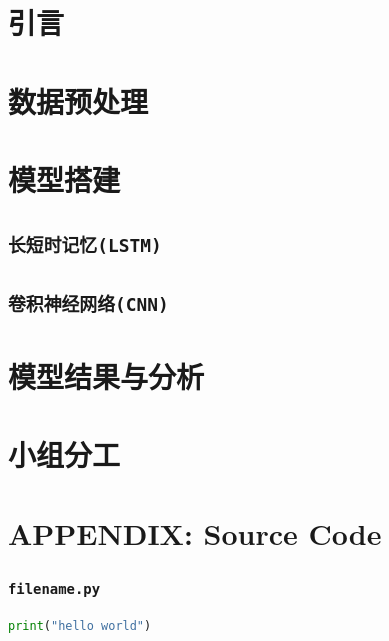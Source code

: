 \documentclass[11pt,a4paper]{elegantpaper}
\begin{document}
\begin{multicols}{2}
\section{引言}


\section{数据预处理}

\section{模型搭建}


\subsection{\lstinline{长短时记忆(LSTM)}}

\subsection{\lstinline{卷积神经网络(CNN)}}


\section{模型结果与分析}


\section{小组分工}

\section{APPENDIX: Source Code}

\subsubsection{\lstinline{filename.py}}

\begin{lstlisting}[language=Python]
print("hello world")
\end{lstlisting}


\nocite{*}

\end{multicols}
\end{document}
